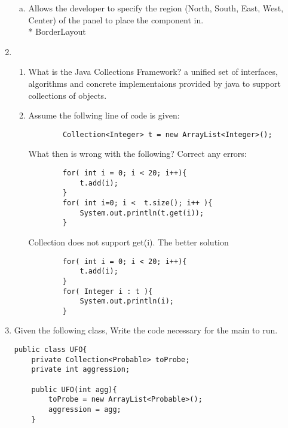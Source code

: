 \documentclass[11pt]{article}
\newenvironment{answer}{\large\lstset{basicstyle=\large}\color{white}}{}
\newenvironment{answer}{\large\lstset{basicstyle=\large}\color{red}}{}
\begin{document}
\begin{enumerate}
\begin{enumerate}[(a)]
\item Allows the developer to specify the region (North, South, East, West, Center) of the panel to place the component in.\\*
\begin{answer}
BorderLayout
\vspace{.5in}
\end{answer}

\end{enumerate}

\item 
    \begin{enumerate} 
    \item What is the Java Collections Framework?
    \begin{answer}
        a unified set of interfaces, algorithms and concrete implementaions 
    provided by java to support collections of objects.
    \end{answer}
    \item Assume the follwing line of code is given:
    \begin{lstlisting}
        Collection<Integer> t = new ArrayList<Integer>();
    \end{lstlisting}
    What then is wrong with the following? Correct any errors:
    \begin{lstlisting}
        for( int i = 0; i < 20; i++){
            t.add(i);
        }
        for( int i=0; i <  t.size(); i++ ){
            System.out.println(t.get(i));
        }
    \end{lstlisting}
    \begin{answer}
    Collection does not support get(i). The better solution 
    \begin{lstlisting}
        for( int i = 0; i < 20; i++){
            t.add(i);
        }
        for( Integer i : t ){
            System.out.println(i);
        }

    \end{lstlisting}
    \end{answer}
    \end{enumerate}
    

\item Given the following class, Write the code necessary for the main to run.
\begin{lstlisting}
public class UFO{
    private Collection<Probable> toProbe;
    private int aggression;

    public UFO(int agg){
        toProbe = new ArrayList<Probable>();
        aggression = agg;
    }


\end{lstlisting}
\end{enumerate}
\end{document}
